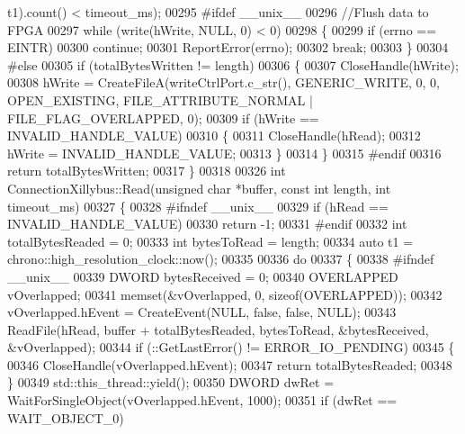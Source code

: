 \begin{DoxyCode}
      t1).count() < timeout\_ms);
00295 \textcolor{preprocessor}{#ifdef \_\_unix\_\_}
00296     \textcolor{comment}{//Flush data to FPGA}
00297     \textcolor{keywordflow}{while} (write(hWrite, NULL, 0) < 0)
00298     \{
00299         \textcolor{keywordflow}{if} (errno == EINTR)
00300             \textcolor{keywordflow}{continue};
00301         ReportError(errno);
00302         \textcolor{keywordflow}{break};
00303     \}
00304 \textcolor{preprocessor}{#else}
00305     \textcolor{keywordflow}{if} (totalBytesWritten != length)
00306     \{
00307         CloseHandle(hWrite);
00308         hWrite = CreateFileA(writeCtrlPort.c\_str(), GENERIC\_WRITE, 0, 0, OPEN\_EXISTING, 
      FILE\_ATTRIBUTE\_NORMAL | FILE\_FLAG\_OVERLAPPED, 0);
00309         \textcolor{keywordflow}{if} (hWrite == INVALID\_HANDLE\_VALUE)
00310         \{
00311             CloseHandle(hRead);
00312             hWrite = INVALID\_HANDLE\_VALUE;
00313         \}
00314      \}
00315 \textcolor{preprocessor}{#endif}
00316     \textcolor{keywordflow}{return} totalBytesWritten;
00317 \}
00318 
00326 \textcolor{keywordtype}{int} ConnectionXillybus::Read(\textcolor{keywordtype}{unsigned} \textcolor{keywordtype}{char} *buffer, \textcolor{keyword}{const} \textcolor{keywordtype}{int} length, \textcolor{keywordtype}{int} 
      timeout_ms)
00327 \{
00328 \textcolor{preprocessor}{#ifndef \_\_unix\_\_}
00329     \textcolor{keywordflow}{if} (hRead == INVALID\_HANDLE\_VALUE)
00330         \textcolor{keywordflow}{return} -1;
00331 \textcolor{preprocessor}{#endif}
00332     \textcolor{keywordtype}{int} totalBytesReaded = 0;
00333     \textcolor{keywordtype}{int} bytesToRead = length;
00334     \textcolor{keyword}{auto} t1 = chrono::high\_resolution\_clock::now();
00335 
00336     \textcolor{keywordflow}{do}
00337     \{
00338 \textcolor{preprocessor}{ #ifndef \_\_unix\_\_}
00339         DWORD bytesReceived = 0;
00340         OVERLAPPED  vOverlapped;
00341         memset(&vOverlapped, 0, \textcolor{keyword}{sizeof}(OVERLAPPED));
00342         vOverlapped.hEvent = CreateEvent(NULL, \textcolor{keyword}{false}, \textcolor{keyword}{false}, NULL);
00343         ReadFile(hRead, buffer + totalBytesReaded, bytesToRead, &bytesReceived, &vOverlapped);
00344         \textcolor{keywordflow}{if} (::GetLastError() != ERROR\_IO\_PENDING)
00345         \{
00346             CloseHandle(vOverlapped.hEvent);
00347             \textcolor{keywordflow}{return} totalBytesReaded;
00348         \}
00349         std::this\_thread::yield();
00350         DWORD dwRet = WaitForSingleObject(vOverlapped.hEvent, 1000);
00351         \textcolor{keywordflow}{if} (dwRet == WAIT\_OBJECT\_0)

\end{DoxyCode}
